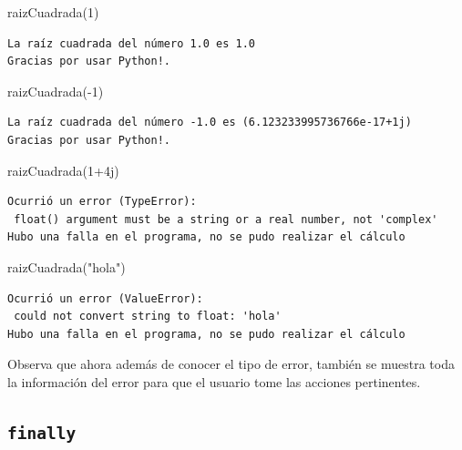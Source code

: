 \documentclass[
  spanish,
  letterpaper,
]{scrbook}
\newenvironment{Shaded}{\begin{snugshade}}{\end{snugshade}}
\newcommand{\DecValTok}[1]{\textcolor[rgb]{0.68,0.00,0.00}{#1}}
\newcommand{\NormalTok}[1]{\textcolor[rgb]{0.00,0.23,0.31}{#1}}
\newcommand{\OperatorTok}[1]{\textcolor[rgb]{0.37,0.37,0.37}{#1}}
\newcommand{\OtherTok}[1]{\textcolor[rgb]{0.00,0.23,0.31}{#1}}
\newcommand{\StringTok}[1]{\textcolor[rgb]{0.13,0.47,0.30}{#1}}
\theoremstyle{definition}
\theoremstyle{remark}
\begin{document}
\begin{Shaded}
\begin{Highlighting}[]
\NormalTok{raizCuadrada(}\DecValTok{1}\NormalTok{)}
\end{Highlighting}
\end{Shaded}

\begin{verbatim}
La raíz cuadrada del número 1.0 es 1.0
Gracias por usar Python!.
\end{verbatim}

\begin{Shaded}
\begin{Highlighting}[]
\NormalTok{raizCuadrada(}\OperatorTok{{-}}\DecValTok{1}\NormalTok{)}
\end{Highlighting}
\end{Shaded}

\begin{verbatim}
La raíz cuadrada del número -1.0 es (6.123233995736766e-17+1j)
Gracias por usar Python!.
\end{verbatim}

\begin{Shaded}
\begin{Highlighting}[]
\NormalTok{raizCuadrada(}\DecValTok{1}\OperatorTok{+}\OtherTok{4j}\NormalTok{)}
\end{Highlighting}
\end{Shaded}

\begin{verbatim}
Ocurrió un error (TypeError):
 float() argument must be a string or a real number, not 'complex'
Hubo una falla en el programa, no se pudo realizar el cálculo
\end{verbatim}

\begin{Shaded}
\begin{Highlighting}[]
\NormalTok{raizCuadrada(}\StringTok{"hola"}\NormalTok{)}
\end{Highlighting}
\end{Shaded}

\begin{verbatim}
Ocurrió un error (ValueError):
 could not convert string to float: 'hola'
Hubo una falla en el programa, no se pudo realizar el cálculo
\end{verbatim}

Observa que ahora además de conocer el tipo de error, también se muestra
toda la información del error para que el usuario tome las acciones
pertinentes.

\subsection{\texorpdfstring{\texttt{finally}}{finally}}\label{finally}
\end{document}
